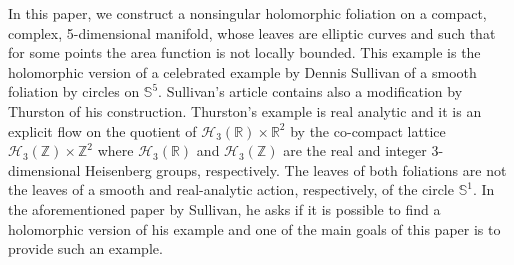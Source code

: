 \documentclass[12pt,twoside,a4paper]{report}
\newcommand{\zah}{\ensuremath{ \mathbb Z }}
\newcommand{\re}{\ensuremath{\mathbb R }}
\newcommand{\sph}{\ensuremath{\mathbb S }}
\begin{document}
 In this paper, we construct a nonsingular holomorphic foliation on a compact, complex, 5-dimensional manifold, whose 
leaves are elliptic curves and such that for some points the area function is not locally bounded.
This example is the holomorphic version of a celebrated example by Dennis Sullivan 
of a smooth foliation by circles on $\sph^5$. Sullivan’s article contains also a modification by Thurston of his construction. Thurston’s example is real analytic and it is an explicit flow on the quotient of $\mathcal{H}_3(\re)\times\re^2$ by the co-compact lattice $\mathcal{H}_3(\zah)\times\zah^2$ where $\mathcal{H}_3(\re)$ and $\mathcal{H}_3(\zah)$ are the real and integer 3-dimensional Heisenberg groups, respectively. The  leaves of both foliations are not the leaves of a smooth and real-analytic action, 
respectively,  of the circle $\sph^1$. In the aforementioned paper by Sullivan, he asks if it is possible to find a holomorphic version of his example and one of the main  goals of this paper is to provide such an example. 
\end{document}
